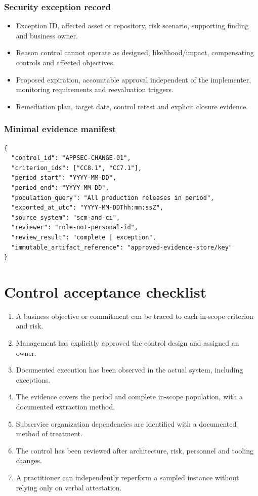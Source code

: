 \documentclass[10pt,oneside]{report}
\begin{document}
\subsection{Security exception record}
\begin{itemize}
\item Exception ID, affected asset or repository, risk scenario, supporting finding and business owner.
\item Reason control cannot operate as designed, likelihood/impact, compensating controls and affected objectives.
\item Proposed expiration, accountable approval independent of the implementer, monitoring requirements and reevaluation triggers.
\item Remediation plan, target date, control retest and explicit closure evidence.
\end{itemize}

\subsection{Minimal evidence manifest}
\begin{lstlisting}[language={},caption={Evidence manifest example (illustrative JSON)}]
{
  "control_id": "APPSEC-CHANGE-01",
  "criterion_ids": ["CC8.1", "CC7.1"],
  "period_start": "YYYY-MM-DD",
  "period_end": "YYYY-MM-DD",
  "population_query": "All production releases in period",
  "exported_at_utc": "YYYY-MM-DDThh:mm:ssZ",
  "source_system": "scm-and-ci",
  "reviewer": "role-not-personal-id",
  "review_result": "complete | exception",
  "immutable_artifact_reference": "approved-evidence-store/key"
}
\end{lstlisting}
\chapter{Control acceptance checklist}
\begin{enumerate}
\item A business objective or commitment can be traced to each in-scope criterion and risk.
\item Management has explicitly approved the control design and assigned an owner.
\item Documented execution has been observed in the actual system, including exceptions.
\item The evidence covers the period and complete in-scope population, with a documented extraction method.
\item Subservice organization dependencies are identified with a documented method of treatment.
\item The control has been reviewed after architecture, risk, personnel and tooling changes.
\item A practitioner can independently reperform a sampled instance without relying only on verbal attestation.
\end{enumerate}
\end{document}
